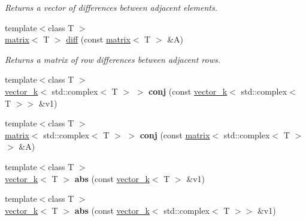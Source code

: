 \begin{DoxyCompactItemize}
\begin{DoxyCompactList}\small\item\em Returns a vector of differences between adjacent elements. \end{DoxyCompactList}\item 
{\footnotesize template$<$class T $>$ }\\\hyperlink{classkeycpp_1_1matrix}{matrix}$<$ T $>$ \hyperlink{namespacekeycpp_abb4e57814fd30b7b8d4845bbc16c73e9}{diff} (const \hyperlink{classkeycpp_1_1matrix}{matrix}$<$ T $>$ \&A)
\begin{DoxyCompactList}\small\item\em Returns a matrix of row differences between adjacent rows. \end{DoxyCompactList}\item 
\hypertarget{namespacekeycpp_a436cfe206bb34dfe613ac495e792b155}{{\footnotesize template$<$class T $>$ }\\\hyperlink{classkeycpp_1_1vector__k}{vector\-\_\-k}$<$ std\-::complex$<$ T $>$ $>$ {\bfseries conj} (const \hyperlink{classkeycpp_1_1vector__k}{vector\-\_\-k}$<$ std\-::complex$<$ T $>$$>$ \&v1)}\label{namespacekeycpp_a436cfe206bb34dfe613ac495e792b155}

\item 
\hypertarget{namespacekeycpp_a0f000b392fbefccdb089383bb6a20151}{{\footnotesize template$<$class T $>$ }\\\hyperlink{classkeycpp_1_1matrix}{matrix}$<$ std\-::complex$<$ T $>$ $>$ {\bfseries conj} (const \hyperlink{classkeycpp_1_1matrix}{matrix}$<$ std\-::complex$<$ T $>$$>$ \&A)}\label{namespacekeycpp_a0f000b392fbefccdb089383bb6a20151}

\item 
\hypertarget{namespacekeycpp_a83cec179e95af014706ce54194efd1b9}{{\footnotesize template$<$class T $>$ }\\\hyperlink{classkeycpp_1_1vector__k}{vector\-\_\-k}$<$ T $>$ {\bfseries abs} (const \hyperlink{classkeycpp_1_1vector__k}{vector\-\_\-k}$<$ T $>$ \&v1)}\label{namespacekeycpp_a83cec179e95af014706ce54194efd1b9}

\item 
\hypertarget{namespacekeycpp_aa48f282087263edb46886e9390b9a833}{{\footnotesize template$<$class T $>$ }\\\hyperlink{classkeycpp_1_1vector__k}{vector\-\_\-k}$<$ T $>$ {\bfseries abs} (const \hyperlink{classkeycpp_1_1vector__k}{vector\-\_\-k}$<$ std\-::complex$<$ T $>$$>$ \&v1)}\label{namespacekeycpp_aa48f282087263edb46886e9390b9a833}


\end{DoxyCompactItemize}
